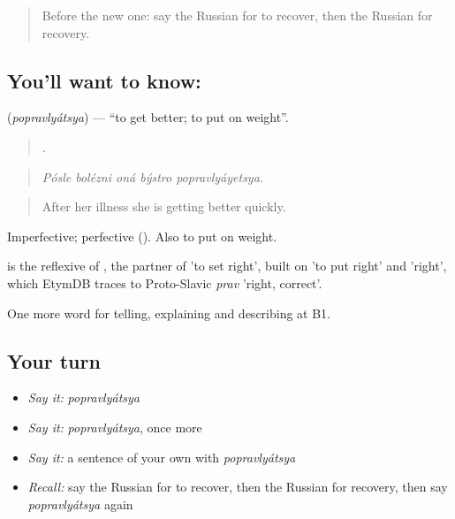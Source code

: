 \label{lesson:RU-C490-popravlyatsya}



\begin{quote}
Before the new one: say the Russian for to recover, then the Russian for recovery.
\end{quote}

\subsection*{You'll want to know: }
\textbf{} (\emph{popravlyátsya}) — \textquotedblleft{}to get better; to put on weight\textquotedblright{}.

\begin{quote}
    .
\end{quote}

\begin{quote}
\emph{Pósle bolézni oná býstro popravlyáyetsya.}
\end{quote}

\begin{quote}
After her illness she is getting better quickly.
\end{quote}

Imperfective; perfective  (). Also to put on weight.

\begin{cousinweb}
\emph{} is the reflexive of \emph{}, the partner of \emph{} 'to set right', built on \emph{} 'to put right' and \emph{} 'right', which EtymDB traces to Proto-Slavic \emph{prav} 'right, correct'.
\end{cousinweb}

\begin{grammarlens}[title={What you've built}]
One more word for telling, explaining and describing at B1.
\end{grammarlens}

\subsection*{Your turn}
\begin{itemize}
\raggedright
  \item \emph{Say it:} \emph{popravlyátsya}
  \item \emph{Say it:} \emph{popravlyátsya}, once more
  \item \emph{Say it:} a sentence of your own with \emph{popravlyátsya}
  \item \emph{Recall:} say the Russian for to recover, then the Russian for recovery, then say \emph{popravlyátsya} again
\end{itemize}

